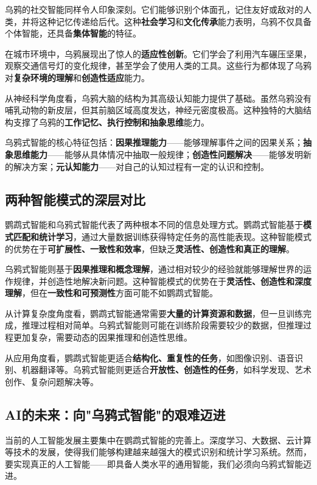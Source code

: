 乌鸦的社交智能同样令人印象深刻。它们能够识别个体面孔，记住友好或敌对的人类，并将这种记忆传递给后代。这种\textbf{社会学习}和\textbf{文化传承}能力表明，乌鸦不仅具备个体智能，还具备\textbf{集体智能}的特征。

在城市环境中，乌鸦展现出了惊人的\textbf{适应性创新}。它们学会了利用汽车碾压坚果，观察交通信号灯的变化规律，甚至学会了使用人类的工具。这些行为都体现了乌鸦对\textbf{复杂环境的理解}和\textbf{创造性适应}能力。

从神经科学角度看，乌鸦大脑的结构为其高级认知能力提供了基础。虽然乌鸦没有哺乳动物的新皮层，但其前脑区域高度发达，神经元密度极高。这种独特的大脑结构支撑了乌鸦的\textbf{工作记忆、执行控制和抽象思维}能力。

乌鸦式智能的核心特征包括：\textbf{因果推理能力}——能够理解事件之间的因果关系；\textbf{抽象思维能力}——能够从具体情况中抽取一般规律；\textbf{创造性问题解决}——能够发明新的解决方案；\textbf{元认知能力}——对自己的认知过程有一定的认识和控制。

\subsection*{两种智能模式的深层对比}

鹦鹉式智能和乌鸦式智能代表了两种根本不同的信息处理方式。鹦鹉式智能基于\textbf{模式匹配和统计学习}，通过大量数据训练获得特定任务的高性能表现。这种智能模式的优势在于\textbf{可扩展性、一致性和效率}，但缺乏\textbf{灵活性、创造性和真正的理解}。

乌鸦式智能则基于\textbf{因果推理和概念理解}，通过相对较少的经验就能够理解世界的运作规律，并创造性地解决新问题。这种智能模式的优势在于\textbf{灵活性、创造性和深度理解}，但在\textbf{一致性和可预测性}方面可能不如鹦鹉式智能。

从计算复杂度角度看，鹦鹉式智能通常需要\textbf{大量的计算资源和数据}，但一旦训练完成，推理过程相对简单。乌鸦式智能则可能在训练阶段需要较少的数据，但推理过程更加复杂，需要动态的因果推理和创造性思维。

从应用角度看，鹦鹉式智能更适合\textbf{结构化、重复性的任务}，如图像识别、语音识别、机器翻译等。乌鸦式智能则更适合\textbf{开放性、创造性的任务}，如科学发现、艺术创作、复杂问题解决等。

\subsection*{AI的未来：向"乌鸦式智能"的艰难迈进}

当前的人工智能发展主要集中在鹦鹉式智能的完善上。深度学习、大数据、云计算等技术的发展，使得我们能够构建越来越强大的模式识别和统计学习系统。然而，要实现真正的人工智能——即具备人类水平的通用智能，我们必须向乌鸦式智能迈进。

